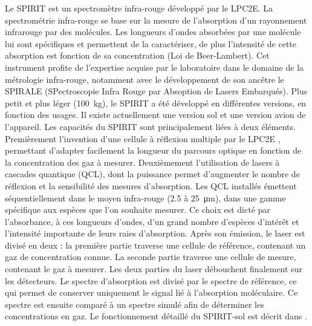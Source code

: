 Le SPIRIT est un spectromètre infra-rouge développé par le LPC2E.
La spectrométrie infra-rouge se base sur la mesure de l'absorption d'un rayonnement infrarouge par des molécules.
Les longueurs d'ondes absorbées par une molécule lui sont spécifiques et permettent de la caractériser, de plus l'intensité de cette absorption est fonction de sa concentration  (Loi de Beer-Lambert).
Cet instrument profite de l'expertise acquise par le laboratoire dans le domaine de la métrologie infra-rouge, notamment avec le développement de son ancêtre le SPIRALE (SPectroscopie Infra Rouge par Absoption de Lasers Embarqués).
Plus petit et plus léger (\SI{100}{\kilo\gram}), le SPIRIT a été développé en différentes versions, en fonction des usages.
Il existe actuellement une version sol et une version avion de l'appareil.
Les capacités du SPIRIT sont principalement liées à deux éléments.
Premièrement l'invention d'une cellule à réflexion multiple par le LPC2E \citep{robert2007}, permettant d'adapter facilement la longueur du parcours optique en fonction de la concentration des gaz à mesurer.
Deuxièmement l'utilisation de lasers à cascades quantique (QCL), dont la puissance permet d'augmenter le nombre de réflexion et la sensibilité des mesures d'absorption.
Les QCL installés émettent séquentiellement dans le moyen infra-rouge (\num{2.5} à \SI{25}{\micro\metre}), dans une gamme spécifique aux espèces que l'on souhaite mesurer.
Ce choix est dicté par l'absorbance, à ces longueurs d'ondes, d'un grand nombre d'espèces d'intérêt et l'intensité importante de leurs raies d'absorption.
Après son émission, le laser est divisé en deux : 
la première partie traverse une cellule de référence, contenant un gaz de concentration connue.
La seconde partie traverse une cellule de mesure, contenant le gaz à mesurer.
Les deux parties du laser débouchent finalement sur les détecteurs.
Le spectre d'absorption est divisé par le spectre de référence, ce qui permet de conserver uniquement le signal lié à l'absorption moléculaire. Ce spectre est ensuite comparé à un spectre simulé afin de déterminer les concentrations en gaz.
Le fonctionnement détaillé du SPIRIT-sol est décrit dans \cite{guimbaud2011}.


